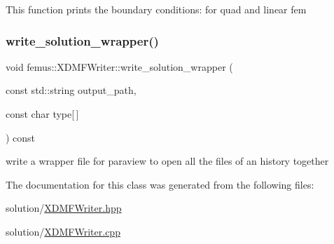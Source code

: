 This function prints the boundary conditions\+: for quad and linear fem \mbox{\label{classfemus_1_1_x_d_m_f_writer_a97bf9e676162c81556d94382a8dbb673}} 
\subsubsection{\texorpdfstring{write\+\_\+solution\+\_\+wrapper()}{write\_solution\_wrapper()}}
{\footnotesize\ttfamily void femus\+::\+X\+D\+M\+F\+Writer\+::write\+\_\+solution\+\_\+wrapper (\begin{DoxyParamCaption}\item[{const std\+::string}]{output\+\_\+path,  }\item[{const char}]{type\mbox{[}$\,$\mbox{]} }\end{DoxyParamCaption}) const}

write a wrapper file for paraview to open all the files of an history together 

The documentation for this class was generated from the following files\+:\begin{DoxyCompactItemize}
\item 
solution/\mbox{\hyperlink{_x_d_m_f_writer_8hpp}{X\+D\+M\+F\+Writer.\+hpp}}\item 
solution/\mbox{\hyperlink{_x_d_m_f_writer_8cpp}{X\+D\+M\+F\+Writer.\+cpp}}\end{DoxyCompactItemize}
